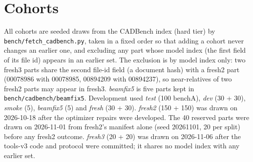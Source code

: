 \section{Cohorts}
\label{app:cohorts}
All cohorts are seeded draws from the CADBench index (hard tier) by \texttt{bench/fetch\_cadbench.py}, taken in a fixed order so that adding a cohort never changes an earlier one, and excluding any part whose model index (the first field of its file id) appears in an earlier set. The exclusion is by model index only: two fresh3 parts share the second file-id field (a document hash) with a fresh2 part (00078986 with 00078985, 00894209 with 00894237), so near-relatives of two fresh2 parts may appear in fresh3. \emph{beamfix5} is five parts kept in \texttt{bench/cadbench/beamfix5}. Development used \emph{test} (100 benchA), \emph{dev} (30 + 30), \emph{smoke} (5), \emph{beamfix5} (5) and \emph{fresh} (30 + 30). \emph{fresh2} (150 + 150) was drawn on 2026-10-18 after the optimizer repairs were developed. The 40 reserved parts were drawn on 2026-11-01 from fresh2's manifest alone (seed 20261101, 20 per split) before any fresh2 outcome. \emph{fresh3} (20 + 20) was drawn on 2026-11-06 after the tools-v3 code and protocol were committed; it shares no model index with any earlier set.

